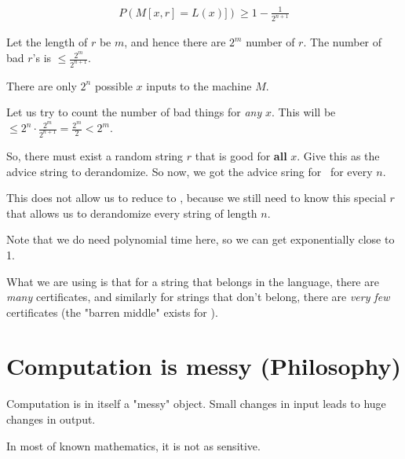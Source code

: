 \begin{align*}
    P(M[x, r] = L(x)]) \geq  1 - \frac{1}{2^{n + 1}}
\end{align*}

Let the length of $r$ be $m$, and hence there are $2^m$  number of $r$.
The number of bad $r$'s is $\leq \frac{2^m}{2^{n + 1}}$.

There are only $2^n$ possible $x$ inputs to the machine $M$.

Let us try to count the number of bad things for \textit{any} $x$. This will 
be $\leq 2^n \cdot \frac{2^m}{2^{n + 1}} = \frac{2^m}{2} < 2^m$.

So, there must exist a random string $r$ that is good for \textbf{all} $x$.
Give this as the advice string to derandomize. So now, we got the advice
sring for \ppoly~for every $n$.

This does not allow us to reduce to \ptime, because we still need to know
this special $r$ that allows us to derandomize every string of length $n$.

Note that we do need polynomial time here, so we can get exponentially close
to 1.

What we are using is that for a string that belongs in the language, there
are \textit{many} certificates, and similarly for strings that don't belong,
there are \textit{very few} certificates (the "barren middle" exists for \bpp).

\section{Computation is messy (Philosophy)}
Computation is in itself a "messy" object. Small changes in input leads
to huge changes in output. 

In most of known mathematics, it is not as sensitive. 
